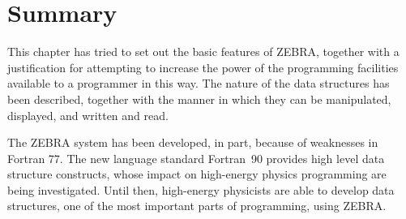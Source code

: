 \section{Summary}

This chapter has tried to set out the basic features of ZEBRA, together
with a justification for attempting to increase the power of the
programming facilities available to a programmer in this way. The nature
of the data structures has been described, together with the manner
in which they
can be manipulated, displayed, and written and read.

The ZEBRA system has been developed, in part, because of weaknesses in
Fortran 77. 
The new language standard Fortran~90 provides high level data structure
constructs, whose impact on high-energy physics programming are being
investigated.
Until then, high-energy physicists are able
to develop data structures, one of the most important parts of
programming, using ZEBRA.
